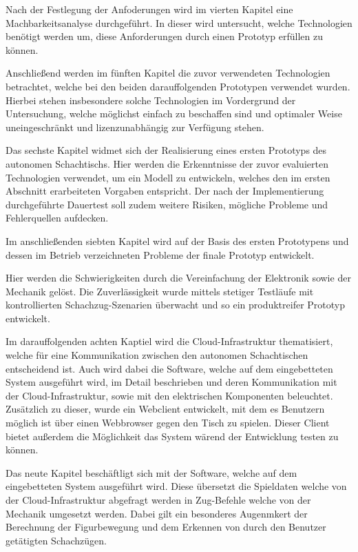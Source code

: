Nach der Festlegung der Anfoderungen wird im vierten Kapitel eine
Machbarkeitsanalyse durchgeführt. In dieser wird untersucht, welche
Technologien benötigt werden um, diese Anforderungen durch einen
Prototyp erfüllen zu können.

Anschließend werden im fünften Kapitel die zuvor verwendeten
Technologien betrachtet, welche bei den beiden darauffolgenden
Prototypen verwendet wurden. Hierbei stehen insbesondere solche
Technologien im Vordergrund der Untersuchung, welche möglichst einfach
zu beschaffen sind und optimaler Weise uneingeschränkt und
lizenzunabhängig zur Verfügung stehen.

Das sechste Kapitel widmet sich der Realisierung eines ersten Prototyps
des autonomen Schachtischs. Hier werden die Erkenntnisse der zuvor
evaluierten Technologien verwendet, um ein Modell zu entwickeln, welches
den im ersten Abschnitt erarbeiteten Vorgaben entspricht. Der nach der
Implementierung durchgeführte Dauertest soll zudem weitere Risiken,
mögliche Probleme und Fehlerquellen aufdecken.

Im anschließenden siebten Kapitel wird auf der Basis des ersten
Prototypens und dessen im Betrieb verzeichneten Probleme der finale
Prototyp entwickelt.

Hier werden die Schwierigkeiten durch die Vereinfachung der Elektronik
sowie der Mechanik gelöst. Die Zuverlässigkeit wurde mittels stetiger
Testläufe mit kontrollierten Schachzug-Szenarien überwacht und so ein
produktreifer Prototyp entwickelt.

Im darauffolgenden achten Kaptiel wird die Cloud-Infrastruktur
thematisiert, welche für eine Kommunikation zwischen den autonomen
Schachtischen entscheidend ist. Auch wird dabei die Software, welche auf
dem eingebetteten System ausgeführt wird, im Detail beschrieben und
deren Kommunikation mit der Cloud-Infrastruktur, sowie mit den
elektrischen Komponenten beleuchtet. Zusätzlich zu dieser, wurde ein
Webclient entwickelt, mit dem es Benutzern möglich ist über einen
Webbrowser gegen den Tisch zu spielen. Dieser Client bietet außerdem die
Möglichkeit das System wärend der Entwicklung testen zu können.

Das neute Kapitel beschäftligt sich mit der Software, welche auf dem
eingebetteten System ausgeführt wird. Diese übersetzt die Spieldaten
welche von der Cloud-Infrastruktur abgefragt werden in Zug-Befehle
welche von der Mechanik umgesetzt werden. Dabei gilt ein besonderes
Augenmkert der Berechnung der Figurbewegung und dem Erkennen von durch
den Benutzer getätigten Schachzügen.

